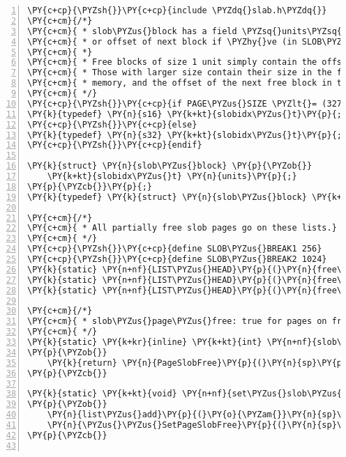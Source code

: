 \begin{Verbatim}[commandchars=\\\{\},numbers=left,firstnumber=1,stepnumber=1]
\PY{c+cp}{\PYZsh{}}\PY{c+cp}{include \PYZdq{}slab.h\PYZdq{}}
\PY{c+cm}{/*}
\PY{c+cm}{ * slob\PYZus{}block has a field \PYZsq{}units\PYZsq{}, which indicates size of block if +ve,}
\PY{c+cm}{ * or offset of next block if \PYZhy{}ve (in SLOB\PYZus{}UNITs).}
\PY{c+cm}{ *}
\PY{c+cm}{ * Free blocks of size 1 unit simply contain the offset of the next block.}
\PY{c+cm}{ * Those with larger size contain their size in the first SLOB\PYZus{}UNIT of}
\PY{c+cm}{ * memory, and the offset of the next free block in the second SLOB\PYZus{}UNIT.}
\PY{c+cm}{ */}
\PY{c+cp}{\PYZsh{}}\PY{c+cp}{if PAGE\PYZus{}SIZE \PYZlt{}= (32767 * 2)}
\PY{k}{typedef} \PY{n}{s16} \PY{k+kt}{slobidx\PYZus{}t}\PY{p}{;}
\PY{c+cp}{\PYZsh{}}\PY{c+cp}{else}
\PY{k}{typedef} \PY{n}{s32} \PY{k+kt}{slobidx\PYZus{}t}\PY{p}{;}
\PY{c+cp}{\PYZsh{}}\PY{c+cp}{endif}

\PY{k}{struct} \PY{n}{slob\PYZus{}block} \PY{p}{\PYZob{}}
	\PY{k+kt}{slobidx\PYZus{}t} \PY{n}{units}\PY{p}{;}
\PY{p}{\PYZcb{}}\PY{p}{;}
\PY{k}{typedef} \PY{k}{struct} \PY{n}{slob\PYZus{}block} \PY{k+kt}{slob\PYZus{}t}\PY{p}{;}

\PY{c+cm}{/*}
\PY{c+cm}{ * All partially free slob pages go on these lists.}
\PY{c+cm}{ */}
\PY{c+cp}{\PYZsh{}}\PY{c+cp}{define SLOB\PYZus{}BREAK1 256}
\PY{c+cp}{\PYZsh{}}\PY{c+cp}{define SLOB\PYZus{}BREAK2 1024}
\PY{k}{static} \PY{n+nf}{LIST\PYZus{}HEAD}\PY{p}{(}\PY{n}{free\PYZus{}slob\PYZus{}small}\PY{p}{)}\PY{p}{;}
\PY{k}{static} \PY{n+nf}{LIST\PYZus{}HEAD}\PY{p}{(}\PY{n}{free\PYZus{}slob\PYZus{}medium}\PY{p}{)}\PY{p}{;}
\PY{k}{static} \PY{n+nf}{LIST\PYZus{}HEAD}\PY{p}{(}\PY{n}{free\PYZus{}slob\PYZus{}large}\PY{p}{)}\PY{p}{;}

\PY{c+cm}{/*}
\PY{c+cm}{ * slob\PYZus{}page\PYZus{}free: true for pages on free\PYZus{}slob\PYZus{}pages list.}
\PY{c+cm}{ */}
\PY{k}{static} \PY{k+kr}{inline} \PY{k+kt}{int} \PY{n+nf}{slob\PYZus{}page\PYZus{}free}\PY{p}{(}\PY{k}{struct} \PY{n}{page} \PY{o}{*}\PY{n}{sp}\PY{p}{)}
\PY{p}{\PYZob{}}
	\PY{k}{return} \PY{n}{PageSlobFree}\PY{p}{(}\PY{n}{sp}\PY{p}{)}\PY{p}{;}
\PY{p}{\PYZcb{}}

\PY{k}{static} \PY{k+kt}{void} \PY{n+nf}{set\PYZus{}slob\PYZus{}page\PYZus{}free}\PY{p}{(}\PY{k}{struct} \PY{n}{page} \PY{o}{*}\PY{n}{sp}\PY{p}{,} \PY{k}{struct} \PY{n}{list\PYZus{}head} \PY{o}{*}\PY{n}{list}\PY{p}{)}
\PY{p}{\PYZob{}}
	\PY{n}{list\PYZus{}add}\PY{p}{(}\PY{o}{\PYZam{}}\PY{n}{sp}\PY{o}{\PYZhy{}}\PY{o}{\PYZgt{}}\PY{n}{list}\PY{p}{,} \PY{n}{list}\PY{p}{)}\PY{p}{;}
	\PY{n}{\PYZus{}\PYZus{}SetPageSlobFree}\PY{p}{(}\PY{n}{sp}\PY{p}{)}\PY{p}{;}
\PY{p}{\PYZcb{}}


\end{Verbatim}
